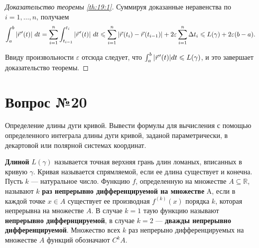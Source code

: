 \documentclass[12pt]{report}
\numberwithin{equation}{section}
\newcommand{\pvec}[1]{\vec{#1}\mkern2mu\vphantom{#1}}
\begin{document}
\begin{proof} [Доказательство теоремы \ref{th:19:1}]
Суммируя доказанные неравенства по $i = 1, \ldots, n$, получаем
\[\int_a^b |\pvec{r}' (t)| ~dt = \sum_{i=1}^n \int_{t_{i-1}}^{t_i} |\pvec{r}'(t)| ~dt \leqslant \sum_{i=1}^n |\pvec{r}(t_i) - \pvec{r}(t_{i-1}) | + 2 \varepsilon \sum_{i=1}^n \Delta t_i \leqslant L(\gamma) + 2 \varepsilon (b-a).\]

Ввиду произвольности $\varepsilon$ отсюда следует, что $\int_a^b |\pvec{r}'(t)|dt \leqslant L(\gamma)$, и это завершает доказательство теоремы.
\end{proof}

\newpage \section{Вопрос №20} %
\begin{framed}
Определение длины дуги кривой. Вывести формулы для вычисления с помощью определенного интеграла длины дуги кривой, заданой параметрически, в декартовой или полярной системах координат.
\end{framed}

\textbf{Длиной} $L(\gamma)$ называется точная верхняя грань длин ломаных, вписанных в кривую $\gamma$. Кривая называется спрямляемой, если ее длина существует и конечна.\\

Пусть $k$ --- натуральное число. Функцию $f$, определенную на множестве  $A \subseteq \mathbb{R}$, называют $k$ \textbf{раз непрерывно дифференцируемой на множестве} A, если в каждой точке $x \in A$ существует ее производная $f^{(k)} (x)$ порядка $k$, которая непрерывна на множестве $A$. В случае $k = 1$ таую функцию называют \textbf{непрерывно диффернцируемой}, в случае $k = 2$ --- \textbf{дважды непрерывно дифференцируемой}. Множество всех $k$ раз непрерыно дифференцируемых на множестве $A$ функций обозначают $C^k A$.
\end{document}
